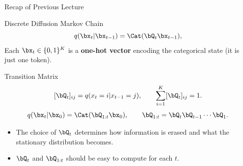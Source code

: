 \documentclass{beamer}
\begin{document}
\begin{frame}{Recap of Previous Lecture}
	\begin{block}{Discrete Diffusion Markov Chain}
		\[
			q(\bx_t|\bx_{t-1}) = \Cat(\bQ_t\bx_{t-1}),
		\]
        Each $\bx_t \in \{0,1\}^K$ is a \textbf{one-hot vector} encoding the categorical state (it is just one token).
	\end{block}
    \begin{block}{Transition Matrix}
		\vspace{-0.5cm}
		\[
			[\bQ_t]_{ij} = q(x_t = i | x_{t-1} = j),
			\qquad
			\sum_{i=1}^K [\bQ_t]_{ij} = 1.
		\]
        \[
            q(\bx_t|\bx_0) = \Cat(\bQ_{1:t}\bx_0),
            \qquad
            \bQ_{1:t} = \bQ_t \bQ_{t-1}\cdots\bQ_1.
        \]
		\vspace{-0.5cm}
	\end{block}
    \begin{itemize}
		\item The choice of $\bQ_t$ determines how information is erased and what the stationary distribution becomes.
		\item $\bQ_t$ and $\bQ_{1:t}$ should be easy to compute for each $t$.
	\end{itemize}
\end{frame}
\end{document}
